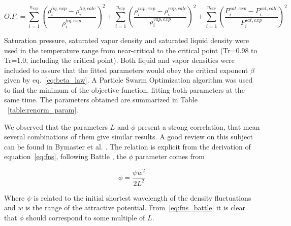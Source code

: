 \documentclass[preprint,12pt,3p]{elsarticle}
\begin{document}
\begin{equation}   \label{eq:OF}
O.F.=\sum_{i=1}^{n_{exp}} \left(\frac{\rho_{i}^{liq,exp}-\rho_{i}^{liq,calc}}{\rho_{i}^{liq,exp}}\right)^2 + \sum_{i=1}^{n_{exp}} \left(\frac{\rho_{i}^{vap,exp}-\rho_{i}^{vap,calc}}{\rho_{i}^{vap,exp}}\right)^2 + \sum_{i=1}^{n_{exp}} \left(\frac{P_{i}^{sat,exp}-P_{i}^{sat,calc}}{P_{i}^{sat,exp}}\right)^2
\end{equation}

Saturation pressure, saturated vapor density and saturated liquid density were used in the temperature range from near-critical to the critical point (Tr=0.98 to Tr=1.0, including the critical point).
Both liquid and vapor densities were included to assure that the fitted parameters would obey the critical exponent $\beta$ given by eq.~\ref{eq:beta_law}.
A Particle Swarm Optimization algorithm was used to find the minimum of the objective function, fitting both parameters at the same time.
The parameters obtained are summarized in Table ~\ref{table:renorm_param}.

\begin{table}[ht!]
\centering
\caption{Estimated Parameters for the renormalization method}
\label{table:renorm_param}
\end{table}

We observed that the parameters $L$ and $\phi$ present a strong correlation, that mean several combinations of them give similar results.
A good review on this subject can be found in Bymaster et al.
\citep{bymaster2008renormalization}.
The relation is explicit from the derivation of equation~\ref{eq:fns}, following Battle \cite{battlerenorm}, the $\phi$ parameter comes from

\begin{equation} \label{eq:fns_battle}
\phi = \frac{\psi w^2}{2L^2}
\end{equation}

Where $\psi$ is related to the initial shortest wavelength of the density fluctuations and $w$ is the range of the attractive potential.
From~\ref{eq:fns_battle} it is clear that $\phi$ should correspond to some multiple of $L$.
\end{document}
